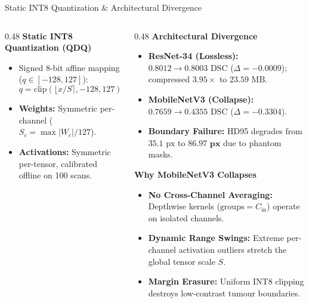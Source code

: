 \documentclass[aspectratio=169, 10pt]{beamer}
\begin{document}
\begin{frame}{Static INT8 Quantization \& Architectural Divergence}
\begin{columns}[T, onlytextwidth]
  \begin{column}{0.48\textwidth}
    \textbf{Static INT8 Quantization (QDQ)}
    \begin{itemize}\setlength{\itemsep}{4pt}\footnotesize
      \item Signed 8-bit affine mapping ($q \in [-128, 127]$):
        $$q = \text{clip}\left(\lfloor x/S \rceil, -128, 127\right), \quad \hat{x} = S \cdot q$$
      \item \textbf{Weights:} Symmetric per-channel ($S_c = \max |W_c| / 127$).
      \item \textbf{Activations:} Symmetric per-tensor, calibrated offline on 100 scans.
    \end{itemize}
  \end{column}

  \begin{column}{0.48\textwidth}
    \textbf{Architectural Divergence}
    \begin{itemize}\setlength{\itemsep}{4pt}\footnotesize
      \item \textbf{ResNet-34 (Lossless):} $0.8012 \to \mathbf{0.8003}\text{ DSC}$ ($\Delta = -0.0009$); compressed $3.95\times$ to $23.59\text{ MB}$.
      \item \textbf{MobileNetV3 (Collapse):} $0.7659 \to \mathbf{0.4355}\text{ DSC}$ ($\Delta = -0.3304$).
      \item \textbf{Boundary Failure:} HD95 degrades from $35.1\text{ px}$ to $\mathbf{86.97\text{ px}}$ due to phantom masks.
    \end{itemize}

\textbf{Why MobileNetV3 Collapses}
    \begin{itemize}\setlength{\itemsep}{4pt}\footnotesize
      \item \textbf{No Cross-Channel Averaging:} Depthwise kernels ($\text{groups} = C_{\text{in}}$) operate on isolated channels.
      \item \textbf{Dynamic Range Swings:} Extreme per-channel activation outliers stretch the global tensor scale $S$.
      \item \textbf{Margin Erasure:} Uniform INT8 clipping destroys low-contrast tumour boundaries.
    \end{itemize}
  \end{column}
\end{columns}
\end{frame}
\end{document}
